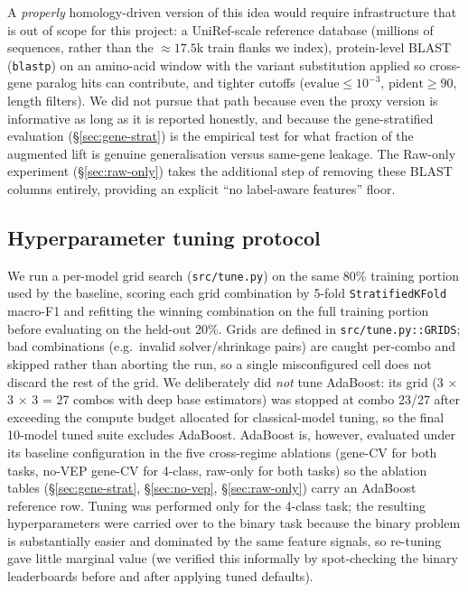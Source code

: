 \documentclass[11pt,a4paper]{article}
\begin{document}
A \emph{properly} homology-driven version of this idea would require
infrastructure that is out of scope for this project: a UniRef-scale
reference database (millions of sequences, rather than the $\approx 17.5$k
train flanks we index), protein-level BLAST (\texttt{blastp}) on an
amino-acid window with the variant substitution applied so cross-gene paralog
hits can contribute, and tighter cutoffs ($\text{evalue}\le 10^{-3}$,
$\text{pident}\ge 90$, length filters). We did not pursue that path because
even the proxy version is informative as long as it is reported honestly, and
because the gene-stratified evaluation (\S\ref{sec:gene-strat}) is the
empirical test for what fraction of the augmented lift is genuine
generalisation versus same-gene leakage. The Raw-only experiment
(\S\ref{sec:raw-only}) takes the additional step of removing
these BLAST columns entirely, providing an explicit ``no label-aware features''
floor.

\subsection{Hyperparameter tuning protocol}
\label{sec:tuning-protocol}

We run a per-model grid search (\texttt{src/tune.py}) on the same 80\%
training portion used by the baseline, scoring each grid combination by
5-fold \texttt{StratifiedKFold} macro-F1 and refitting the winning
combination on the full training portion before evaluating on the held-out
20\%. Grids are defined in \texttt{src/tune.py::GRIDS}; bad combinations
(e.g.\ invalid solver/shrinkage pairs) are caught per-combo and skipped
rather than aborting the run, so a single misconfigured cell does not
discard the rest of the grid. We deliberately did \emph{not} tune AdaBoost:
its grid (3 $\times$ 3 $\times$ 3 = 27 combos with deep base estimators)
was stopped at combo 23/27 after exceeding the compute budget allocated for
classical-model tuning, so the final 10-model tuned suite excludes AdaBoost.
AdaBoost is, however, evaluated under its baseline configuration in the five
cross-regime ablations (gene-CV for both tasks, no-VEP gene-CV for 4-class,
raw-only for both tasks) so the ablation tables (\S\ref{sec:gene-strat},
\S\ref{sec:no-vep}, \S\ref{sec:raw-only}) carry an AdaBoost reference row.
Tuning was performed only for the 4-class task; the resulting hyperparameters
were carried over to the binary task because the binary problem is
substantially easier and dominated by the same feature signals, so re-tuning
gave little marginal value (we verified this informally by spot-checking the
binary leaderboards before and after applying tuned defaults).
\end{document}
